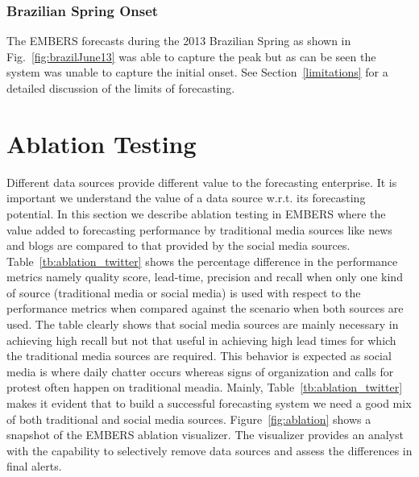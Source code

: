 \documentclass[11pt,a4paper,extrafontsizes,oneside]{article}
\begin{document}
\subsubsection{Brazilian Spring Onset}
The EMBERS forecasts during the 2013 Brazilian Spring as shown in Fig.~\ref{fig:brazilJune13} was able to capture
the peak but as can be seen the system was unable to capture the initial
onset.  See Section~\ref{limitations} for a detailed discussion of
the limits of forecasting.

\section{Ablation Testing}
\label{sec:ablation}
Different data sources provide different value to
the forecasting enterprise. It is important we understand the
value of a data source w.r.t. its forecasting potential.
In this section we describe ablation testing in EMBERS where the value added to forecasting performance by traditional media
sources like news and
blogs are compared to that provided by the social media sources.
Table~\ref{tb:ablation_twitter} shows the percentage difference in the performance metrics namely quality score, lead-time, precision and recall when only one
kind of source (traditional media or social media) is used with respect to the performance metrics when compared against the scenario when
both sources are used.
The table clearly shows that social media sources are mainly necessary in achieving high recall but not that useful in achieving high
lead times for which the traditional media sources are required. This
behavior is expected as social media is where daily chatter
occurs whereas signs of organization and calls for protest often
happen on traditional meadia.
Mainly, Table~\ref{tb:ablation_twitter} makes it evident that to build a successful forecasting system we need a good mix
of both traditional and social media sources.  Figure~\ref{fig:ablation} shows a snapshot of the EMBERS ablation visualizer. The visualizer provides an
analyst with the capability to selectively
remove data sources and assess the differences in final alerts.
\end{document}
